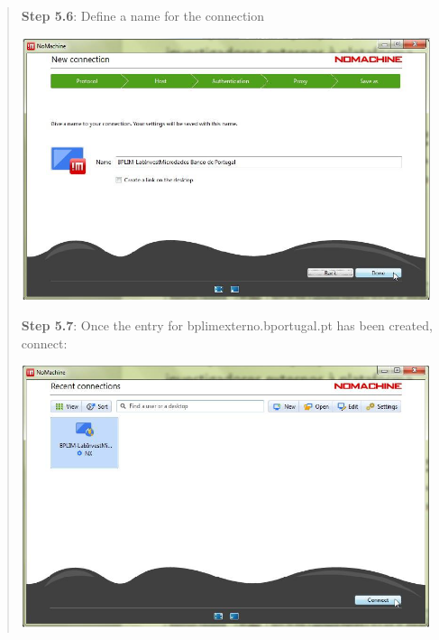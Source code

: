 \documentclass[
  11pt,
  a4paper,
]{article}
\begin{document}
\begin{quote}
\textbf{Step 5.6}: Define a name for the connection

\includegraphics[width=4.72441in,height=3.03165in]{./media/image31.png}

\textbf{Step 5.7}: Once the entry for bplimexterno.bportugal.pt has been
created, connect:

\includegraphics[width=4.72441in,height=3.03698in]{./media/image32.png}
\end{quote}

\textbf{\hfill\break
}
\end{document}
